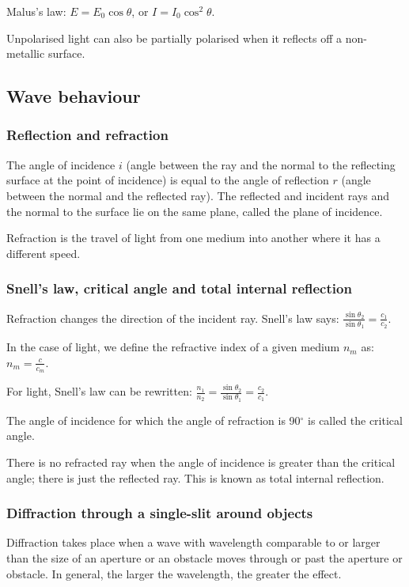 Malus's law: $E = E_0 \cos\theta$, or $I = I_0 \cos^2 \theta$.

Unpolarised light can also be partially polarised when it reflects off a
non-metallic surface.

\subsection{Wave behaviour}

\subsubsection{Reflection and refraction}
The angle of incidence $i$ (angle between the ray and the normal to the
reflecting surface at the point of incidence) is equal to the angle of
reflection $r$ (angle between the normal and the reflected ray). The reflected
and incident rays and the normal to the surface lie on the same plane, called
the plane of incidence.

Refraction is the travel of light from one medium into another where it has a
different speed. 

\subsubsection{Snell's law, critical angle and total internal reflection}
Refraction changes the direction of the incident ray. Snell's law says:
$\frac{\sin\theta_2}{\sin\theta_1} = \frac{c_1}{c_2}$.

In the case of light, we define the refractive index of a given medium $n_m$
as: $n_m = \frac{c}{c_m}$.

For light, Snell's law can be rewritten:
$\frac{n_1}{n_2} = \frac{\sin\theta_2}{\sin\theta_1} = \frac{c_2}{c_1}$.

The angle of incidence for which the angle of refraction is 90$^{\circ}$ is
called the critical angle.

There is no refracted ray when the angle of incidence is greater than the
critical angle; there is just the reflected ray. This is known as total
internal reflection.

\subsubsection{Diffraction through a single-slit around objects}
Diffraction takes place when a wave with wavelength comparable to or larger
than the size of an aperture or an obstacle moves through or past the aperture
or obstacle. In general, the larger the wavelength, the greater the effect.

